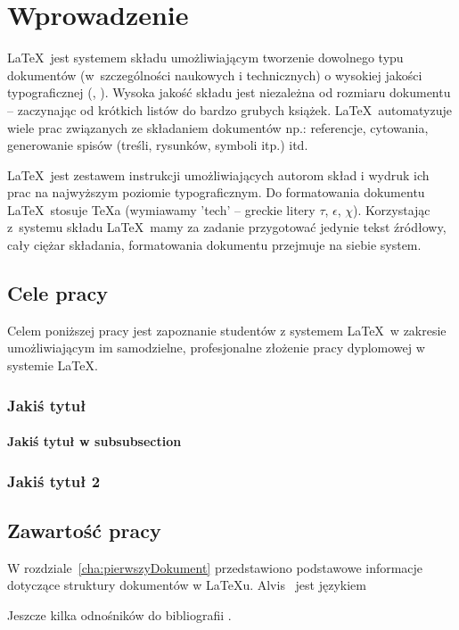 \chapter{Wprowadzenie}
\label{cha:wprowadzenie}

\LaTeX~jest systemem składu umożliwiającym tworzenie dowolnego typu dokumentów (w~szczególności naukowych i technicznych) o wysokiej jakości typograficznej (\cite{Dil00}, \cite{Lam92}). Wysoka jakość składu jest niezależna od rozmiaru dokumentu -- zaczynając od krótkich listów do bardzo grubych książek. \LaTeX~automatyzuje wiele prac związanych ze składaniem dokumentów np.: referencje, cytowania, generowanie spisów (treśli, rysunków, symboli itp.) itd.

\LaTeX~jest zestawem instrukcji umożliwiających autorom skład i wydruk ich prac na najwyższym poziomie typograficznym. Do formatowania dokumentu \LaTeX~stosuje \TeX a (wymiawamy 'tech' -- greckie litery $\tau$, $\epsilon$, $\chi$). Korzystając z~systemu składu \LaTeX~mamy za zadanie przygotować jedynie tekst źródłowy, cały ciężar składania, formatowania dokumentu przejmuje na siebie system.


\section{Cele pracy}
\label{sec:celePracy}


Celem poniższej pracy jest zapoznanie studentów z systemem \LaTeX~w zakresie umożliwiającym im samodzielne, profesjonalne złożenie pracy dyplomowej w systemie \LaTeX.

\subsection{Jakiś tytuł}

\subsubsection{Jakiś tytuł w subsubsection}


\subsection{Jakiś tytuł 2}


\section{Zawartość pracy}
\label{sec:zawartoscPracy}

W rozdziale~\ref{cha:pierwszyDokument} przedstawiono podstawowe informacje dotyczące struktury dokumentów w \LaTeX u. Alvis~\cite{Alvis2011} jest językiem\textellipsis

Jeszcze kilka odnośników do bibliografii \cite{PeDa04,BuDo03}.
